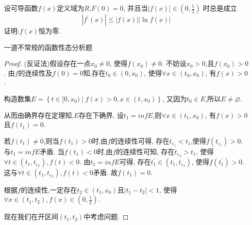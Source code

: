 \documentclass[lang=cn,newtx,10pt,scheme=chinese]{elegantbook}
\begin{document}
\begin{example}
  设可导函数$f(x)$定义域为$R$,$F(0)=0$,
  并且当$\left| f\left( x \right) \right|\in \left( 0,\frac{1}{2} \right) $
  时总是成立
  \begin{equation}
    \left| f^{\prime}\left( x \right) \right|\leqslant \left| f\left( x \right) \right|\left| \ln f\left( x \right) \right|
    \nonumber
  \end{equation}
  证明:$f(x)$恒为零.
\end{example}
  \begin{note}
    一道不常规的函数性态分析题
  \end{note}
\begin{proof}
    (反证法)假设存在一点$x_0\ne 0$,
    使得$f(x_0)\ne 0$.
    不妨设$x_0> 0$,且$f(x_0)>0$.
    由$f$的连续性及$f(0)=0$知,存在$t_0\in(0,x_0)$,
    使得$\forall x\in(t_0,x_0)$,
    有$f(x)>0$.

    构造数集$E=\left\{ t\in [0,x_0)\mid f\left( x \right) >0,x\in \left( t,x_0 \right) \right\} $,
    又因为$t_0\in E$,所以$E \ne \varnothing $.

    从而由确界存在定理知,$E$存在下确界,
    设$t_1=inf E$,则$\forall x\in (t_1,x_0)$,
    有$f(x)>0$且$f(t_1)=0$.

    若$f(t_1)\ne 0$,则当$f(t_1)>0$时,由$f$的连续性可得,
    存在$t_{\varepsilon_1}<t_1$,使得$f(t_{\varepsilon_1})>0$.
    与$t_1=inf E$矛盾.
    当$f(t_1)<0$时,由$f$的连续性可知,
    存在$t_{\varepsilon_2}>t_1$,
    使得$\forall t\in(t_1,t_{\varepsilon_2}),f(t)<0$.
    由$t_1=inf E$可得,
    存在$t_1^{\prime}\in (t_1,t_{\varepsilon_2})$,
    使得$f(t_1^{\prime})>0$.这与$\forall t\in(t_1,t_{\varepsilon_2}),f(t)<0$矛盾.
    故$f(t_1)=0$.
    
    根据$f$的连续性,一定存在$t_2\in(t_1,x_0)$且$\left| t_1-t_2 \right|<1$,
    使得$\forall x\in (t_1,t_2),f(x)\in(0,\frac{1}{2})$.

    现在我们在开区间$(t_1,t_2)$中考虑问题.


\end{proof}
\end{document}
